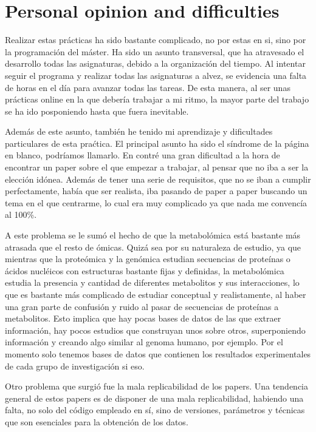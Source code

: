 \documentclass{article}
\begin{document}
\section{Personal opinion and difficulties}

Realizar estas prácticas ha sido bastante complicado, no por estas en si, sino por la programación del máster. Ha sido un asunto transversal, que ha atravesado el desarrollo todas las asignaturas, debido a la organización del tiempo. Al intentar seguir el programa y realizar todas las asignaturas a alvez, se evidencia una falta de horas en el día para avanzar todas las tareas. De esta manera, al ser unas prácticas online en la que debería trabajar a mi ritmo, la mayor parte del trabajo se ha ido posponiendo hasta que fuera inevitable.

Además de este asunto, también he tenido mi aprendizaje y dificultades particulares de esta praćtica. El principal asunto ha sido el síndrome de la página en blanco, podríamos llamarlo. En contré una gran dificultad a la hora de encontrar un paper sobre el que empezar a trabajar, al pensar que no iba a ser la elección idónea. Además de tener una serie de requisitos, que no se iban a cumplir perfectamente, había que ser realista, iba pasando de paper a paper buscando un tema en el que centrarme, lo cual era muy complicado ya que nada me convencía al 100\%.

A este problema se le sumó el hecho de que la metabolómica está bastante más atrasada que el resto de ómicas. Quizá sea por su naturaleza de estudio, ya que mientras que la proteómica y la genómica estudian secuencias de proteínas o ácidos nucléicos con estructuras bastante fijas y definidas, la metabolómica estudia la presencia y cantidad de diferentes metabolitos y sus interacciones, lo que es bastante más complicado de estudiar conceptual y realistamente, al haber una gran parte de confusión y ruido al pasar de secuencias de proteínas a metabolitos. Esto implica que hay pocas bases de datos de las que extraer información, hay pocos estudios que construyan unos sobre otros, superponiendo información y creando algo similar al genoma humano, por ejemplo. Por el momento solo tenemos bases de datos que contienen los resultados experimentales de cada grupo de investigación si eso.

Otro problema que surgió fue la mala replicabilidad de los papers. Una tendencia general de estos papers es de disponer de una mala replicabilidad, habiendo una falta, no solo del código empleado en sí, sino de versiones, parámetros y técnicas que son esenciales para la obtención de los datos.
\end{document}
